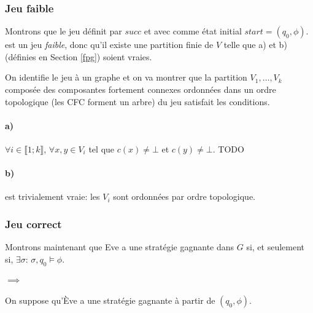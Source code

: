 \documentclass[10pt,a4paper]{article}
\begin{document}
\subsubsection{Jeu faible}
Montrons que le jeu définit par $succ$ et avec comme état initial $start = (q_0, \phi)$.
 est un jeu \emph{faible}, donc qu'il existe une partition finie de $V$ telle que a) et b) (définies en Section \ref{fpg}) soient vraies.

On identifie le jeu à un graphe et on va montrer que la partition $V_1, \dots, V_k$ composée des composantes fortement connexes ordonnées dans un ordre topologique (les CFC forment un arbre) du jeu satisfait les conditions.

\paragraph{a)}
$\forall i \in \llbracket 1 ; k \rrbracket$, $\forall x,y \in V_i$ tel que $c(x) \neq \bot$ et $c(y) \neq \bot$. TODO

\paragraph{b)} est trivialement vraie: les $V_i$ sont ordonnées par ordre topologique.

\subsubsection{Jeu correct}
Montrons maintenant que Eve a une stratégie gagnante dans $G$ si, et seulement si, $\exists \sigma$: $\sigma,q_0 \vDash \phi$.

\paragraph{$\implies$}
On suppose qu'Ève a une stratégie gagnante à partir de $(q_0, \phi)$.
\end{document}
